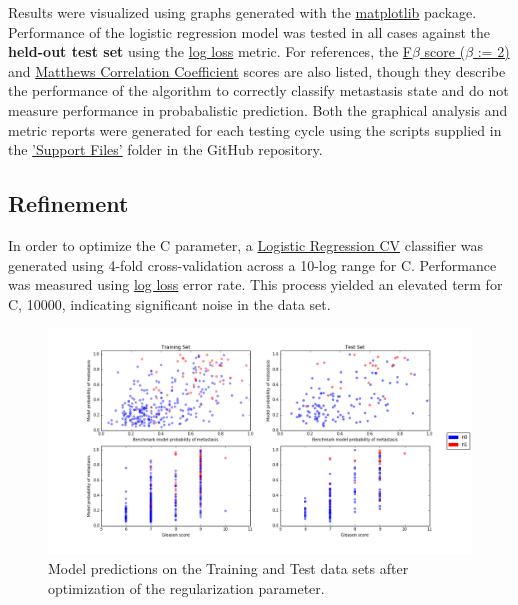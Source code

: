 \documentclass[final]{article}
\begin{document}
Results were visualized using graphs generated with the
\href{http://matplotlib.org/index.html}{matplotlib} package.  Performance of the
logistic regression model was tested in all cases against the \textbf{held-out test set} using the
\href{http://scikit-learn.org/stable/modules/generated/sklearn.metrics.log_loss.html#sklearn.metrics.log_loss}{log
loss} metric.  For references, the
\href{http://scikit-learn.org/stable/modules/generated/sklearn.metrics.fbeta_score.html}{F$\beta$
score ($\beta$ := 2)} and
\href{http://scikit-learn.org/stable/modules/generated/sklearn.metrics.matthews_corrcoef.html}{Matthews
Correlation Coefficient} scores are also listed, though they describe the
performance of the algorithm to correctly classify metastasis state and do not
measure performance in probabalistic prediction.  Both the graphical analysis
and metric reports were generated for each testing cycle using the scripts
supplied in the
\href{https://github.com/CCThompson82/MLE_capstone/tree/master/Support%20Files}{'Support
Files'} folder in the GitHub repository.

\subsection{Refinement}

In order to optimize the C parameter, a \href{http://scikit-learn.org/stable/modules/generated/sklearn.linear_model.LogisticRegressionCV.html#sklearn.linear_model.LogisticRegressionCV}{Logistic Regression CV}
classifier was generated using 4-fold cross-validation across a 10-log range for C.
Performance was measured using \href{http://scikit-learn.org/stable/modules/generated/sklearn.metrics.log_loss.html#sklearn.metrics.log_loss}{log loss}
error rate.  This process yielded an elevated term for C, 10000, indicating significant noise in the data set.

\begin{figure} [h!]
  \centering
    \includegraphics[width=\textwidth]{optPC3}
    \caption{\label{fig:PC3}Model predictions on the Training and Test data sets after optimization of the regularization parameter.  }
\end{figure}
\end{document}
